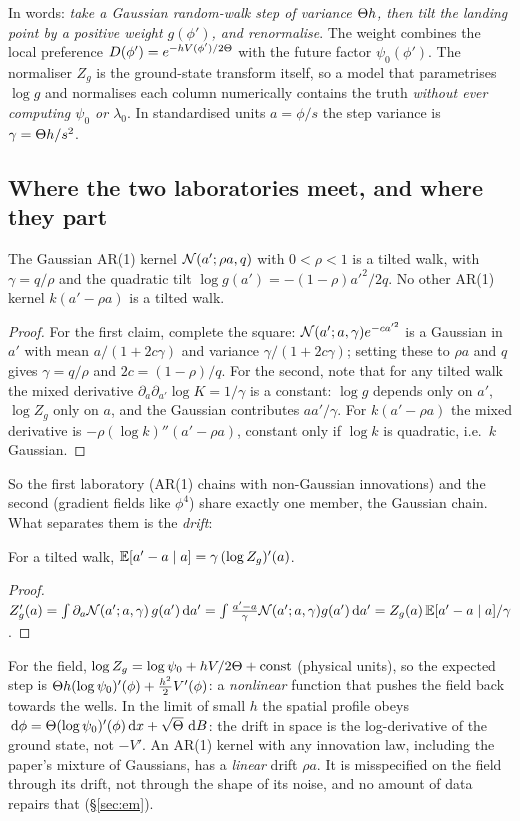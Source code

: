In words: \emph{take a Gaussian random-walk step of variance $\Theta h$, then tilt the landing point by a positive weight
$g(\phi')$, and renormalise}. The weight combines the local preference $D(\phi')=e^{-hV(\phi')/2\Theta}$ with the future factor
$\psi_0(\phi')$. The normaliser $Z_g$ is the ground-state transform itself, so a model that parametrises $\log g$ and
normalises each column numerically contains the truth \emph{without ever computing $\psi_0$ or $\lambda_0$}. In
standardised units $a=\phi/s$ the step variance is $\gamma=\Theta h/s^2$.

\subsection{Where the two laboratories meet, and where they part}

\begin{proposition}\label{prop:embed}
The Gaussian AR(1) kernel $\mathcal{N}(a';\rho a,q)$ with $0<\rho<1$ is a tilted walk, with $\gamma=q/\rho$ and the quadratic tilt
$\log g(a')=-(1-\rho)a'^2/2q$. No other AR(1) kernel $k(a'-\rho a)$ is a tilted walk.
\end{proposition}
\begin{proof}
For the first claim, complete the square: $\mathcal{N}(a';a,\gamma)e^{-ca'^2}$ is a Gaussian in $a'$ with mean $a/(1+2c\gamma)$ and
variance $\gamma/(1+2c\gamma)$; setting these to $\rho a$ and $q$ gives $\gamma=q/\rho$ and $2c=(1-\rho)/q$. For the second, note
that for any tilted walk the mixed derivative $\partial_a\partial_{a'}\log K=1/\gamma$ is a constant: $\log g$ depends only on
$a'$, $\log Z_g$ only on $a$, and the Gaussian contributes $aa'/\gamma$. For $k(a'-\rho a)$ the mixed derivative is
$-\rho(\log k)''(a'-\rho a)$, constant only if $\log k$ is quadratic, i.e.\ $k$ Gaussian.
\end{proof}

So the first laboratory (AR(1) chains with non-Gaussian innovations) and the second (gradient fields like
$\phi^4$) share exactly one member, the Gaussian chain. What separates them is the \emph{drift}:

\begin{proposition}
For a tilted walk, $\mathbb{E}[a'-a\mid a]=\gamma\,(\log Z_g)'(a)$.
\end{proposition}
\begin{proof}
$Z_g'(a)=\int\partial_a\mathcal{N}(a';a,\gamma)\,g(a')\,\mathrm{d} a'=\int\frac{a'-a}{\gamma}\mathcal{N}(a';a,\gamma)g(a')\,\mathrm{d} a'=Z_g(a)\,\mathbb{E}[a'-a\mid a]/\gamma$.
\end{proof}
For the field, $\log Z_g=\log\psi_0+hV/2\Theta+\text{const}$ (physical units), so the expected step is
$\Theta h(\log\psi_0)'(\phi)+\tfrac{h^2}{2}V'(\phi)$: a \emph{nonlinear} function that pushes the field back towards the wells.
In the limit of small $h$ the spatial profile obeys $\,\mathrm{d}\phi=\Theta(\log\psi_0)'(\phi)\,\mathrm{d} x+\sqrt{\Theta}\,\,\mathrm{d} B$: the drift in space is the
log-derivative of the ground state, not $-V'$. An AR(1) kernel with any innovation law, including the paper's
mixture of Gaussians, has a \emph{linear} drift $\rho a$. It is misspecified on the field through its drift, not
through the shape of its noise, and no amount of data repairs that (\S\ref{sec:em}).


